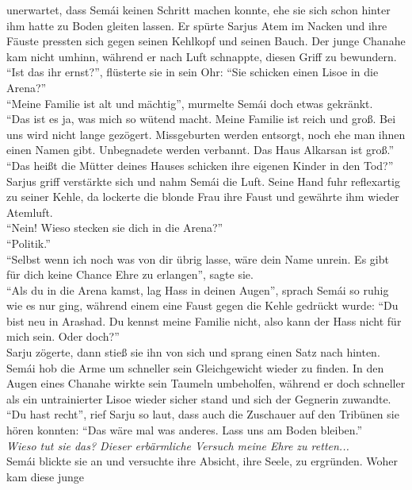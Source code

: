 unerwartet, dass Semái keinen Schritt machen konnte, ehe sie sich schon hinter ihm hatte zu Boden 
gleiten lassen. Er spürte Sarjus Atem im Nacken und ihre Fäuste pressten sich gegen seinen Kehlkopf 
und seinen Bauch. Der junge Chanahe kam nicht umhinn, während er nach Luft schnappte, diesen Griff 
zu bewundern.\\
``Ist das ihr ernst?'', flüsterte sie in sein Ohr: ``Sie schicken einen Lisoe in die Arena?''\\
``Meine Familie ist alt und mächtig'', murmelte Semái doch etwas gekränkt.\\
``Das ist es ja, was mich so wütend macht. Meine Familie ist reich und groß. Bei uns wird nicht 
lange gezögert. Missgeburten werden entsorgt, noch ehe man ihnen einen Namen gibt. Unbegnadete 
werden verbannt. Das Haus Alkarsan ist groß.''\\
``Das heißt die Mütter deines Hauses schicken ihre eigenen Kinder in den Tod?''\\
Sarjus griff verstärkte sich und nahm Semái die Luft. Seine Hand fuhr reflexartig zu seiner Kehle, 
da lockerte die blonde Frau ihre Faust und gewährte ihm wieder Atemluft. \\
``Nein! Wieso stecken sie dich in die Arena?''\\
``Politik.''\\
``Selbst wenn ich noch was von dir übrig lasse, wäre dein Name unrein. Es gibt für dich keine 
Chance Ehre zu erlangen'', sagte sie.\\
``Als du in die Arena kamst, lag Hass in deinen Augen'', sprach Semái so ruhig wie es nur ging, 
während einem eine Faust gegen die Kehle gedrückt wurde: ``Du bist neu in Arashad. Du kennst meine 
Familie nicht, also kann der Hass nicht für mich sein. Oder doch?''\\
Sarju zögerte, dann stieß sie ihn von sich und sprang einen Satz nach hinten. Semái hob die Arme um 
schneller sein Gleichgewicht wieder zu finden. In den Augen eines Chanahe wirkte sein Taumeln 
umbeholfen, während er doch schneller als ein untrainierter Lisoe wieder sicher stand und sich der 
Gegnerin zuwandte. \\
``Du hast recht'', rief Sarju so laut, dass auch die Zuschauer auf den Tribünen sie hören konnten: 
``Das wäre mal was anderes. Lass uns am Boden bleiben.''\\
\textit{Wieso tut sie das? Dieser erbärmliche Versuch meine Ehre zu retten... }\\
Semái blickte sie an und versuchte ihre Absicht, ihre Seele, zu ergründen. Woher kam diese junge 
